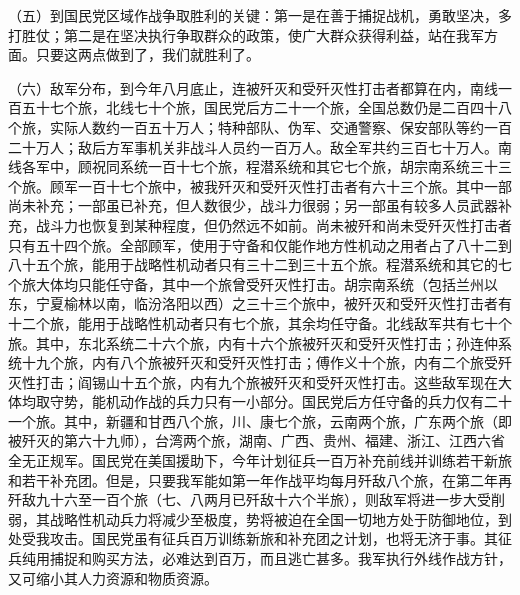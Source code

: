 （五）到国民党区域作战争取胜利的关键：第一是在善于捕捉战机，勇敢坚决，多打胜仗；第二是在坚决执行争取群众的政策，使广大群众获得利益，站在我军方面。只要这两点做到了，我们就胜利了。

（六）敌军分布，到今年八月底止，连被歼灭和受歼灭性打击者都算在内，南线一百五十七个旅，北线七十个旅，国民党后方二十一个旅，全国总数仍是二百四十八个旅，实际人数约一百五十万人；特种部队、伪军、交通警察、保安部队等约一百二十万人；敌后方军事机关非战斗人员约一百万人。敌全军共约三百七十万人。南线各军中，顾祝同系统一百十七个旅，程潜系统和其它七个旅，胡宗南系统三十三个旅。顾军一百十七个旅中，被我歼灭和受歼灭性打击者有六十三个旅。其中一部尚未补充；一部虽已补充，但人数很少，战斗力很弱；另一部虽有较多人员武器补充，战斗力也恢复到某种程度，但仍然远不如前。尚未被歼和尚未受歼灭性打击者只有五十四个旅。全部顾军，使用于守备和仅能作地方性机动之用者占了八十二到八十五个旅，能用于战略性机动者只有三十二到三十五个旅。程潜系统和其它的七个旅大体均只能任守备，其中一个旅曾受歼灭性打击。胡宗南系统（包括兰州以东，宁夏榆林以南，临汾洛阳以西）之三十三个旅中，被歼灭和受歼灭性打击者有十二个旅，能用于战略性机动者只有七个旅，其余均任守备。北线敌军共有七十个旅。其中，东北系统二十六个旅，内有十六个旅被歼灭和受歼灭性打击；孙连仲系统十九个旅，内有八个旅被歼灭和受歼灭性打击；傅作义十个旅，内有二个旅受歼灭性打击；阎锡山十五个旅，内有九个旅被歼灭和受歼灭性打击。这些敌军现在大体均取守势，能机动作战的兵力只有一小部分。国民党后方任守备的兵力仅有二十一个旅。其中，新疆和甘西八个旅，川、康七个旅，云南两个旅，广东两个旅（即被歼灭的第六十九师），台湾两个旅，湖南、广西、贵州、福建、浙江、江西六省全无正规军。国民党在美国援助下，今年计划征兵一百万补充前线并训练若干新旅和若干补充团。但是，只要我军能如第一年作战平均每月歼敌八个旅，在第二年再歼敌九十六至一百个旅（七、八两月已歼敌十六个半旅），则敌军将进一步大受削弱，其战略性机动兵力将减少至极度，势将被迫在全国一切地方处于防御地位，到处受我攻击。国民党虽有征兵百万训练新旅和补充团之计划，也将无济于事。其征兵纯用捕捉和购买方法，必难达到百万，而且逃亡甚多。我军执行外线作战方针，又可缩小其人力资源和物质资源。

